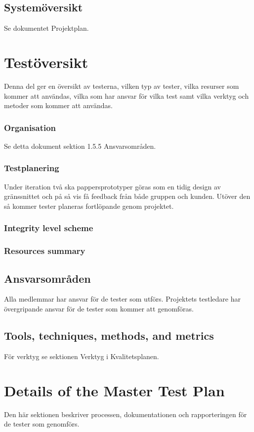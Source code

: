 \documentclass[a4paper,10pt]{article}
\begin{document}
\subsection{Systemöversikt}
Se dokumentet Projektplan.

\section{Testöversikt}
Denna del ger en översikt av testerna, vilken typ av tester, vilka resurser som kommer att användas, vilka som har ansvar för vilka test samt vilka verktyg och metoder som kommer att användas.

\subsubsection{Organisation}
Se detta dokument sektion 1.5.5 Ansvarsområden.

\subsubsection{Testplanering}
Under iteration två ska pappersprototyper göras som en tidig design av gränssnittet och på så vis få feedback från både gruppen och kunden. Utöver den så kommer tester planeras fortlöpande genom projektet.

\subsubsection{Integrity level scheme}
\subsubsection{Resources summary}
\subsection{Ansvarsområden}
Alla medlemmar har ansvar för de tester som utförs. Projektets testledare har övergripande ansvar för de tester som kommer att genomföras.
\subsection{Tools, techniques, methods, and metrics}
För verktyg se sektionen Verktyg i Kvalitetsplanen.
\section{Details of the Master Test Plan}
Den här sektionen beskriver processen, dokumentationen och rapporteringen för de tester som genomförs.
\end{document}
